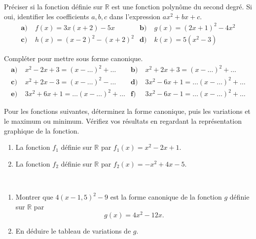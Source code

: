 \documentclass[11pt]{article}
\begin{document}
\begin{exo}
  Préciser si la fonction définie sur $\mathbb{R}$ est une fonction polynôme du
  second degré. Si oui, identifier les coefficients $a, b, c$ dans l'expression
  $ax^2+bx+c$.
  \begin{align*}
    \textbf{a)}&\; f(x) = 3x(x+2)-5x &
    \textbf{b)}&\; g(x) = (2x+1)^2-4x^2 \\
    \textbf{c)}&\; h(x) = (x-2)^2-(x+2)^2 &
    \textbf{d)}&\; k(x) = 5(x^2-3)
  \end{align*}
\end{exo}

\begin{exo}
  Compléter pour mettre sous forme canonique.
  \begin{align*}
    \textbf{a)}&\; x^2-2x+3 = (x-\ldots)^2+\ldots &
    \textbf{b)}&\; x^2+2x+3 = (x-\ldots)^2+\ldots \\
    \textbf{c)}&\; x^2+2x-3 = (x-\ldots)^2-\ldots & 
    \textbf{d)}&\; 3x^2-6x+1 = \ldots(x-\ldots)^2+\ldots \\
    \textbf{e)}&\; 3x^2+6x+1 = \ldots(x-\ldots)^2+\ldots &
    \textbf{f)}&\; 3x^2-6x-1 = \ldots(x-\ldots)^2+\ldots
  \end{align*}
\end{exo}

\begin{exo}
  Pour les fonctions suivantes, déterminez la forme canonique, puis les
  variations et le maximum ou minimum. Vérifiez vos résultats en regardant la
  représentation graphique de la fonction.
  \begin{enumerate}
    \item La fonction $f_1$ définie sur $\mathbb{R}$ par $f_1(x)=x^2-2x+1$.
    \item La fonction $f_2$ définie sur $\mathbb{R}$ par $f_2(x)=-x^2+4x-5$.
  \end{enumerate}
\end{exo}

\begin{exo}~
  \begin{enumerate}
    \item Montrer que $4(x-1,5)^2-9$ est la forme canonique de la fonction $g$ définie
  sur $\mathbb{R}$ par
  \[
    g(x) = 4x^2-12x.
  \]
\item En déduire le tableau de variations de $g$.
  \end{enumerate}
\end{exo}
\end{document}
